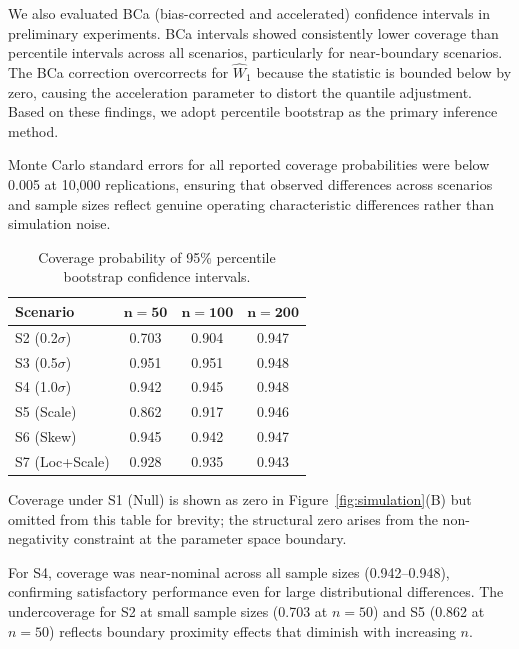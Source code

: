 \documentclass[AMA,Times1COL]{WileyNJDv5}
\begin{document}
We also evaluated BCa (bias-corrected and accelerated) confidence intervals in preliminary experiments. BCa intervals showed consistently lower coverage than percentile intervals across all scenarios, particularly for near-boundary scenarios. The BCa correction overcorrects for $\widehat{W}_1$ because the statistic is bounded below by zero, causing the acceleration parameter to distort the quantile adjustment. Based on these findings, we adopt percentile bootstrap as the primary inference method.

Monte Carlo standard errors for all reported coverage probabilities were below 0.005 at 10{,}000 replications, ensuring that observed differences across scenarios and sample sizes reflect genuine operating characteristic differences rather than simulation noise.

\begin{table}[ht]
\centering
\caption{Coverage probability of 95\% percentile bootstrap confidence intervals.\label{tab:coverage}}
\begin{tabular}{lccc}
\toprule
\textbf{Scenario} & $\boldsymbol{n=50}$ & $\boldsymbol{n=100}$ & $\boldsymbol{n=200}$ \\
\midrule
S2 (0.2$\sigma$) & 0.703 & 0.904 & 0.947 \\
S3 (0.5$\sigma$) & 0.951 & 0.951 & 0.948 \\
S4 (1.0$\sigma$) & 0.942 & 0.945 & 0.948 \\
S5 (Scale) & 0.862 & 0.917 & 0.946 \\
S6 (Skew) & 0.945 & 0.942 & 0.947 \\
S7 (Loc+Scale) & 0.928 & 0.935 & 0.943 \\
\bottomrule
\end{tabular}
\begin{tablenotes}
\item Coverage under S1 (Null) is shown as zero in Figure~\ref{fig:simulation}(B) but omitted from this table for brevity; the structural zero arises from the non-negativity constraint at the parameter space boundary.
\item For S4, coverage was near-nominal across all sample sizes (0.942--0.948), confirming satisfactory performance even for large distributional differences. The undercoverage for S2 at small sample sizes (0.703 at $n=50$) and S5 (0.862 at $n=50$) reflects boundary proximity effects that diminish with increasing $n$.
\end{tablenotes}
\end{table}
\end{document}
